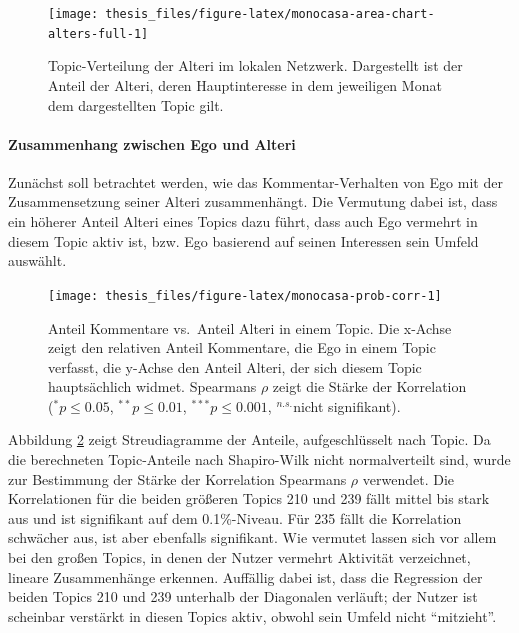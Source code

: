 \documentclass[11pt,a4paper,twoside]{article}
\let\oldpar\paragraph
\renewcommand{\paragraph}{\oldpar*}
\begin{document}
\begin{figure}

{\centering \texttt{[image: thesis\_files/figure-latex/monocasa-area-chart-alters-full-1]} 

}

\caption{Topic-Verteilung der Alteri im
lokalen Netzwerk. Dargestellt ist der Anteil der Alteri, deren
Hauptinteresse in dem jeweiligen Monat dem dargestellten Topic gilt.}\label{fig:monocasa-area-chart-alters-full}
\end{figure}

\hypertarget{zusammenhang-zwischen-ego-und-alteri}{%
\paragraph{Zusammenhang zwischen Ego und
Alteri}\label{zusammenhang-zwischen-ego-und-alteri}}

Zunächst soll betrachtet werden, wie das Kommentar-Verhalten von Ego mit
der Zusammensetzung seiner Alteri zusammenhängt. Die Vermutung dabei
ist, dass ein höherer Anteil Alteri eines Topics dazu führt, dass auch
Ego vermehrt in diesem Topic aktiv ist, bzw. Ego basierend auf seinen
Interessen sein Umfeld auswählt.








\begin{figure}

{\centering \texttt{[image: thesis\_files/figure-latex/monocasa-prob-corr-1]} 

}

\caption{Anteil Kommentare vs.~Anteil Alteri in einem
Topic. Die x-Achse zeigt den relativen Anteil Kommentare, die Ego in
einem Topic verfasst, die y-Achse den Anteil Alteri, der sich diesem
Topic hauptsächlich widmet. Spearmans \(\rho\) zeigt die Stärke der
Korrelation (\(^{*}p\le0.05\), \(^{**}p\le0.01\), \(^{***}p\le0.001\),
\(^{n.s.}\)nicht signifikant).}\label{fig:monocasa-prob-corr}
\end{figure}

Abbildung \ref{fig:monocasa-prob-corr} zeigt Streudiagramme der Anteile,
aufgeschlüsselt nach Topic. Da die berechneten Topic-Anteile nach
Shapiro-Wilk nicht normalverteilt sind, wurde zur Bestimmung der Stärke
der Korrelation Spearmans \(\rho\) verwendet. Die Korrelationen für die
beiden größeren Topics 210 und 239 fällt mittel bis stark aus und ist
signifikant auf dem 0.1\%-Niveau. Für 235 fällt die Korrelation
schwächer aus, ist aber ebenfalls signifikant. Wie vermutet lassen sich
vor allem bei den großen Topics, in denen der Nutzer vermehrt Aktivität
verzeichnet, lineare Zusammenhänge erkennen. Auffällig dabei ist, dass
die Regression der beiden Topics 210 und 239 unterhalb der Diagonalen
verläuft; der Nutzer ist scheinbar verstärkt in diesen Topics aktiv,
obwohl sein Umfeld nicht \enquote{mitzieht}.
\end{document}
